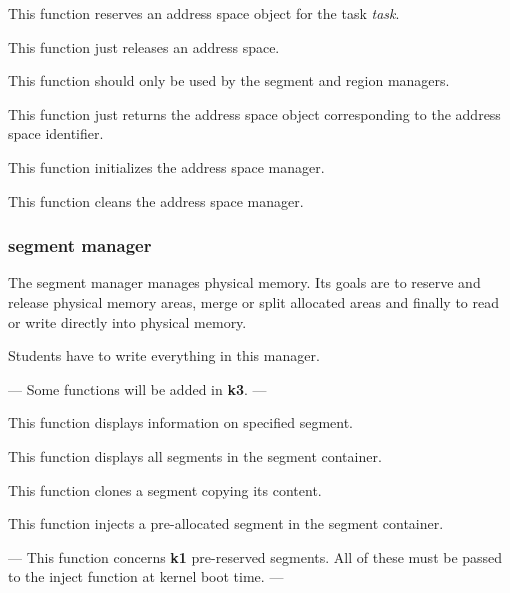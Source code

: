 	  {This function reserves an address space object for the
	    task \textit{task}.}

	  {This function just releases an address space.}

	  {This function should only be used by the segment and region
	    managers.

	    This function just returns the address space object
	    corresponding to the address space identifier.}

	  {This function initializes the address space manager.}

	  {This function cleans the address space manager.}

%
%

\subsubsection{segment manager}

The segment manager manages physical memory. Its goals are to reserve
and release physical memory areas, merge or split allocated areas and finally
to read or write directly into physical memory.

Students have to write everything in this manager.

---
Some functions will be added in \textbf{k3}.
---

	  {This function displays information on specified segment.}

	  {This function displays all segments in the segment container.}

	  {This function clones a segment copying its content.}

	  {This function injects a pre-allocated segment in the segment
	    container.

	    ---
	    This function concerns \textbf{k1} pre-reserved segments.
	    All of these must be passed to the inject function at kernel
	    boot time.
	    ---}

